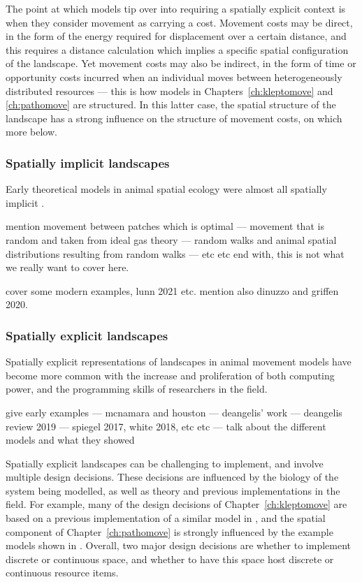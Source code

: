 The point at which models tip over into requiring a spatially explicit context is when they consider movement as carrying a cost.
Movement costs may be direct, in the form of the energy required for displacement over a certain distance, and this requires a distance calculation which implies a specific spatial configuration of the landscape.
Yet movement costs may also be indirect, in the form of time or opportunity costs incurred when an individual moves between heterogeneously distributed resources --- this is how models in Chapters~\ref{ch:kleptomove} and \ref{ch:pathomove} are structured.
In this latter case, the spatial structure of the landscape has a strong influence on the structure of movement costs, on which more below.

\subsubsection*{Spatially implicit landscapes}

Early theoretical models in animal spatial ecology were almost all spatially implicit \citep{fretwell1970,charnov1976}.

mention movement between patches which is optimal --- movement that is random and taken from ideal gas theory --- random walks and animal spatial distributions resulting from random walks --- etc etc
end with, this is not what we really want to cover here.

cover some modern examples, lunn 2021 etc. mention also dinuzzo and griffen 2020.

\subsubsection*{Spatially explicit landscapes}

Spatially explicit representations of landscapes in animal movement models have become more common with the increase and proliferation of both computing power, and the programming skills of researchers in the field.

give early examples --- mcnamara and houston --- deangelis' work --- deangelis review 2019 --- spiegel 2017, white 2018, etc etc --- talk about the different models and what they showed

Spatially explicit landscapes can be challenging to implement, and involve multiple design decisions.
These decisions are influenced by the biology of the system being modelled, as well as theory and previous implementations in the field.
For example, many of the design decisions of Chapter~\ref{ch:kleptomove} are based on a previous implementation of a similar model in \citet{netz2021a}, and the spatial component of Chapter~\ref{ch:pathomove} is strongly influenced by the example models shown in \citet{spiegel2017}.
Overall, two major design decisions are whether to implement discrete or continuous space, and whether to have this space host discrete or continuous resource items.

